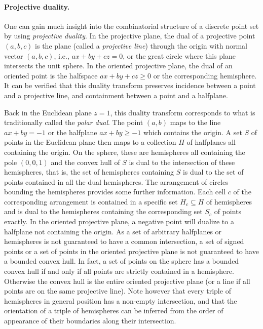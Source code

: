 \documentclass[leqno,12pt]{article}
\begin{document}
\paragraph{Projective duality.}
One can gain
 much
 insight into the combinatorial structure of a
discrete
  point set by using \emph{projective duality}. In the
projective plane, the dual of a projective point $(a,b,c)$ is the
plane (called a \emph{projective line}) through the origin with normal
vector $(a,b,c)$, i.e., $ax+by+cz=0$, 
or the great circle where this plane intersects the unit sphere. In
the oriented projective plane, the dual of an oriented point is the
halfspace $ax+by+cz\geq 0$ or the corresponding hemisphere. 
It can 
be verified that this duality transform preserves
incidence between a point and a projective line, and containment between a point
and a halfplane. 

Back in the Euclidean plane $z=1$, this duality transform corresponds
to what is traditionally called the \emph{polar dual}. The point
$(a,b)$ maps to the line $ax+by = -1$ or the halfplane $ax+by \geq -1$
which contains the origin. A set $S$ of points in the Euclidean plane then maps to a
collection $H$ of halfplanes all containing the origin. 
On the sphere, these are hemispheres all containing
the pole $(0,0,1)$ and the convex
hull of $S$ is dual to the intersection of these hemispheres, that is,
the set of hemispheres containing $S$ is dual to the set of points
contained in all the dual hemispheres. 
The arrangement of circles bounding the hemispheres provides some
further information. Each cell $c$ of the corresponding arrangement is
contained in a specific set $H_c\subseteq H$ of hemispheres and is
dual to the hemispheres containing the corresponding set $S_c$ of
points exactly. 
In the oriented projective plane, a negative point will
dualize to a halfplane not containing the origin.
As a set of arbitrary halfplanes or hemispheres is not guaranteed to
have a common intersection,  a set of signed points or a set of points in
the oriented projective plane is not guaranteed to have a bounded convex
hull. In fact, a set of points on the sphere has a bounded convex hull
if and only if all points are strictly contained in a hemisphere. Otherwise the
convex hull is the entire oriented projective plane (or a line if all
points are on the same projective line).
Note however that every triple of hemispheres in general position has
a non-empty intersection, and that the orientation of a triple of
hemispheres can be inferred from the order of appearance of their
boundaries along their intersection.\\
\end{document}
